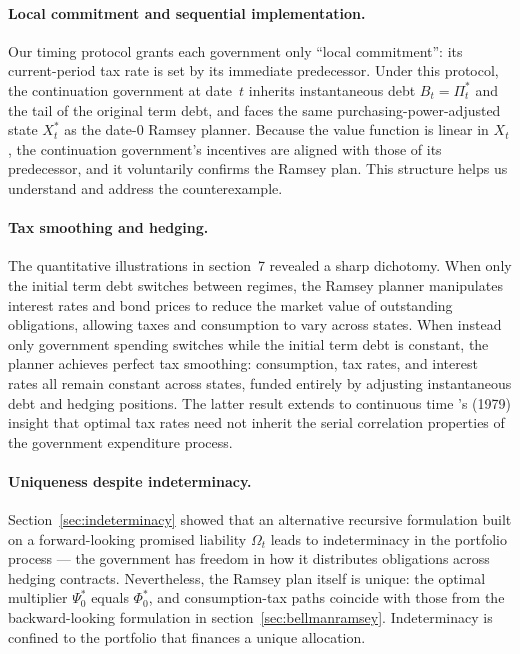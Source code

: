 \documentclass[12pt]{article}
\begin{document}
\paragraph{Local commitment and sequential implementation.}
Our timing protocol grants each government only ``local commitment'': its current-period tax rate is set by its immediate predecessor.  Under this protocol, the continuation government at date~$t$ inherits instantaneous debt $B_t = \Pi_t^\ast$ and the tail of the original term debt, and faces the same purchasing-power-adjusted state $X_t^\ast$ as the date-0 Ramsey planner.  Because the value function is linear in $X_t$, the continuation government's incentives are aligned with those of its predecessor, and it voluntarily confirms the Ramsey plan.  This structure helps us understand and address the \cite*{debortoli2021optimal} counterexample.

\paragraph{Tax smoothing and hedging.}
The quantitative illustrations in section~7 revealed a sharp dichotomy.  When only the initial term debt  switches between regimes, the Ramsey planner manipulates interest rates and bond prices to reduce the  market value of outstanding obligations,  allowing taxes  and consumption to vary across states.  When instead only government spending switches while the initial term debt is constant, the planner achieves perfect tax smoothing: consumption, tax rates, and interest rates all remain constant across states, funded entirely by adjusting instantaneous debt and hedging positions.  The latter result extends to continuous time \citeauthor{barro1979determination}'s (1979) insight that optimal tax rates need not inherit the serial correlation properties of the government expenditure process.

\paragraph{Uniqueness despite indeterminacy.}
Section~\ref{sec:indeterminacy} showed that an alternative recursive formulation built on a forward-looking  promised liability $\Omega_t$ leads to indeterminacy in the portfolio process --- the government has freedom  in how it distributes  obligations  across hedging contracts.  Nevertheless, the Ramsey plan itself is unique: the optimal multiplier $\Psi_0^\ast$ equals $\Phi_0^\ast$, and consumption-tax paths coincide with those from the backward-looking formulation in section~\ref{sec:bellmanramsey}.  Indeterminacy is  confined to the  portfolio  that finances a unique allocation. 
\end{document}
